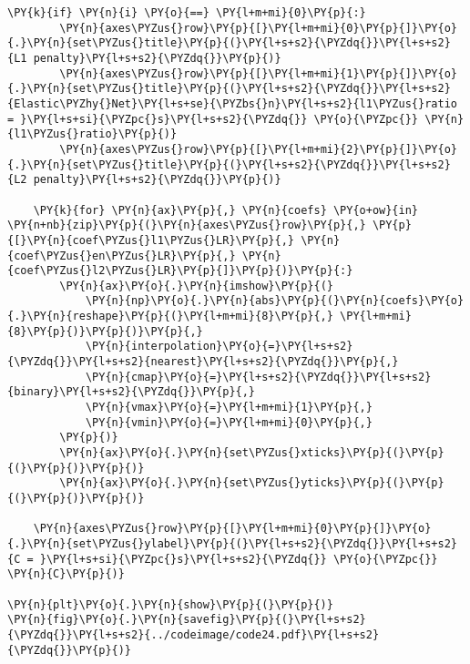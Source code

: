\begin{Verbatim}[commandchars=\\\{\}]
    \PY{k}{if} \PY{n}{i} \PY{o}{==} \PY{l+m+mi}{0}\PY{p}{:}
        \PY{n}{axes\PYZus{}row}\PY{p}{[}\PY{l+m+mi}{0}\PY{p}{]}\PY{o}{.}\PY{n}{set\PYZus{}title}\PY{p}{(}\PY{l+s+s2}{\PYZdq{}}\PY{l+s+s2}{L1 penalty}\PY{l+s+s2}{\PYZdq{}}\PY{p}{)}
        \PY{n}{axes\PYZus{}row}\PY{p}{[}\PY{l+m+mi}{1}\PY{p}{]}\PY{o}{.}\PY{n}{set\PYZus{}title}\PY{p}{(}\PY{l+s+s2}{\PYZdq{}}\PY{l+s+s2}{Elastic\PYZhy{}Net}\PY{l+s+se}{\PYZbs{}n}\PY{l+s+s2}{l1\PYZus{}ratio = }\PY{l+s+si}{\PYZpc{}s}\PY{l+s+s2}{\PYZdq{}} \PY{o}{\PYZpc{}} \PY{n}{l1\PYZus{}ratio}\PY{p}{)}
        \PY{n}{axes\PYZus{}row}\PY{p}{[}\PY{l+m+mi}{2}\PY{p}{]}\PY{o}{.}\PY{n}{set\PYZus{}title}\PY{p}{(}\PY{l+s+s2}{\PYZdq{}}\PY{l+s+s2}{L2 penalty}\PY{l+s+s2}{\PYZdq{}}\PY{p}{)}

    \PY{k}{for} \PY{n}{ax}\PY{p}{,} \PY{n}{coefs} \PY{o+ow}{in} \PY{n+nb}{zip}\PY{p}{(}\PY{n}{axes\PYZus{}row}\PY{p}{,} \PY{p}{[}\PY{n}{coef\PYZus{}l1\PYZus{}LR}\PY{p}{,} \PY{n}{coef\PYZus{}en\PYZus{}LR}\PY{p}{,} \PY{n}{coef\PYZus{}l2\PYZus{}LR}\PY{p}{]}\PY{p}{)}\PY{p}{:}
        \PY{n}{ax}\PY{o}{.}\PY{n}{imshow}\PY{p}{(}
            \PY{n}{np}\PY{o}{.}\PY{n}{abs}\PY{p}{(}\PY{n}{coefs}\PY{o}{.}\PY{n}{reshape}\PY{p}{(}\PY{l+m+mi}{8}\PY{p}{,} \PY{l+m+mi}{8}\PY{p}{)}\PY{p}{)}\PY{p}{,}
            \PY{n}{interpolation}\PY{o}{=}\PY{l+s+s2}{\PYZdq{}}\PY{l+s+s2}{nearest}\PY{l+s+s2}{\PYZdq{}}\PY{p}{,}
            \PY{n}{cmap}\PY{o}{=}\PY{l+s+s2}{\PYZdq{}}\PY{l+s+s2}{binary}\PY{l+s+s2}{\PYZdq{}}\PY{p}{,}
            \PY{n}{vmax}\PY{o}{=}\PY{l+m+mi}{1}\PY{p}{,}
            \PY{n}{vmin}\PY{o}{=}\PY{l+m+mi}{0}\PY{p}{,}
        \PY{p}{)}
        \PY{n}{ax}\PY{o}{.}\PY{n}{set\PYZus{}xticks}\PY{p}{(}\PY{p}{(}\PY{p}{)}\PY{p}{)}
        \PY{n}{ax}\PY{o}{.}\PY{n}{set\PYZus{}yticks}\PY{p}{(}\PY{p}{(}\PY{p}{)}\PY{p}{)}

    \PY{n}{axes\PYZus{}row}\PY{p}{[}\PY{l+m+mi}{0}\PY{p}{]}\PY{o}{.}\PY{n}{set\PYZus{}ylabel}\PY{p}{(}\PY{l+s+s2}{\PYZdq{}}\PY{l+s+s2}{C = }\PY{l+s+si}{\PYZpc{}s}\PY{l+s+s2}{\PYZdq{}} \PY{o}{\PYZpc{}} \PY{n}{C}\PY{p}{)}

\PY{n}{plt}\PY{o}{.}\PY{n}{show}\PY{p}{(}\PY{p}{)}
\PY{n}{fig}\PY{o}{.}\PY{n}{savefig}\PY{p}{(}\PY{l+s+s2}{\PYZdq{}}\PY{l+s+s2}{../codeimage/code24.pdf}\PY{l+s+s2}{\PYZdq{}}\PY{p}{)}
\end{Verbatim}

